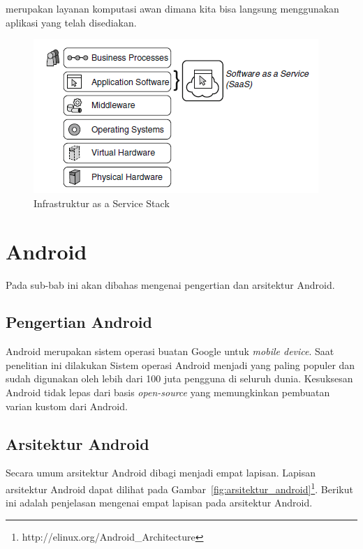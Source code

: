 \begin{itemize}
	merupakan layanan komputasi awan dimana kita bisa langsung menggunakan aplikasi yang telah disediakan.
	\begin{figure}[h]
		\centering
			\includegraphics{Gambar/saas-infrastruktur}
		\caption{Infrastruktur as a Service Stack}
		\label{fig:saas-infrastruktur}
	\end{figure}
\end{itemize}

\section{Android}
\label{sec:android}

Pada sub-bab ini akan dibahas mengenai pengertian dan arsitektur Android.

\subsection{Pengertian Android}
\label{subsec:pengertianandroid}

Android merupakan sistem operasi buatan Google untuk \textit{mobile device}. Saat penelitian ini dilakukan Sistem operasi Android menjadi yang paling populer dan sudah digunakan oleh lebih dari 100 juta pengguna di seluruh dunia. Kesuksesan Android tidak lepas dari basis \textit{open-source} yang memungkinkan pembuatan varian kustom dari Android.

\subsection{Arsitektur Android}
\label{subsec:arsitektur}

Secara umum arsitektur Android dibagi menjadi empat lapisan. Lapisan arsitektur Android dapat dilihat pada Gambar~\ref{fig:arsitektur_android}\footnote{http://elinux.org/Android\_Architecture}. Berikut ini adalah penjelasan mengenai empat lapisan pada arsitektur Android.

